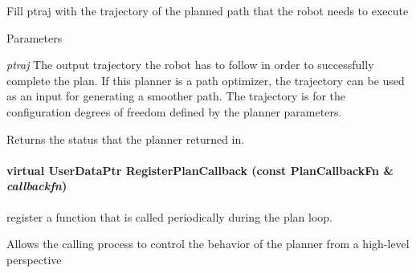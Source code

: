Fill ptraj with the trajectory of the planned path that the robot needs to execute 
\begin{DoxyParams}{Parameters}
\item[{\em ptraj}]The output trajectory the robot has to follow in order to successfully complete the plan. If this planner is a path optimizer, the trajectory can be used as an input for generating a smoother path. The trajectory is for the configuration degrees of freedom defined by the planner parameters. \end{DoxyParams}
\begin{DoxyReturn}{Returns}
the status that the planner returned in. 
\end{DoxyReturn}
\hypertarget{classOpenRAVE_1_1PlannerBase_a7b72116e4770d98f2a78297246a679e8}{
\paragraph[{RegisterPlanCallback}]{\setlength{\rightskip}{0pt plus 5cm}virtual UserDataPtr RegisterPlanCallback (const {\bf PlanCallbackFn} \& {\em callbackfn})}\hfill}
\label{classOpenRAVE_1_1PlannerBase_a7b72116e4770d98f2a78297246a679e8}


register a function that is called periodically during the plan loop. 

Allows the calling process to control the behavior of the planner from a high-\/level perspective 